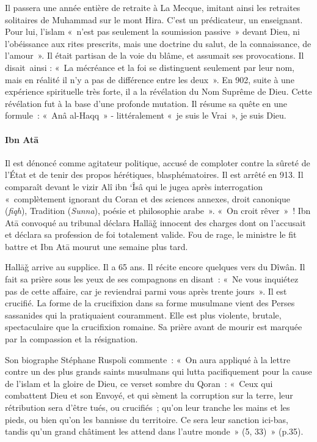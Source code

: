 Il passera une année entière de retraite à La Mecque, imitant ainsi les
retraites solitaires de Muhammad sur le mont Hira. C'est un prédicateur,
un enseignant. Pour lui, l'islam «~n'est pas seulement la soumission
passive~» devant Dieu, ni l'obéissance aux rites prescrits, mais une
doctrine du salut, de la connaissance, de l'amour~». Il était partisan
de la voie du blâme, et assumait ses provocations. Il disait~ainsi :
«~La mécréance et la foi se distinguent seulement par leur nom, mais en
réalité il n'y a pas de différence entre les deux~». En 902, suite à une
expérience spirituelle très forte, il a la révélation du Nom Suprême de
Dieu. Cette révélation fut à la base d'une profonde mutation. Il résume
sa quête en une formule~: «~Anâ al-Haqq~» - littéralement «~je suis le
Vrai~», je suis Dieu.

 
\paragraph{Ibn Atā}\label{ibn-atux101}

Il est dénoncé comme agitateur politique, accusé de comploter contre la
sûreté de l'État et de tenir des propos hérétiques, blasphématoires. Il
est arrêté en 913. Il comparaît devant le vizir Alî ibn `Îsâ qui le
jugea après interrogation «~complètement ignorant du Coran et des
sciences annexes, droit canonique (\emph{fiqh}), Tradition
(\emph{Sunna}), poésie et philosophie arabe~». «~On croit rêver~»~! Ibn Atā convoqué au
tribunal déclara Hallāǧ innocent des charges dont on l'accusait et
déclara sa profession de foi totalement valide. Fou de rage, le ministre
le fit battre et Ibn Atā mourut une semaine plus tard.

Hallāǧ arrive au supplice. Il a 65 ans. Il récite encore quelques vers
du Dîwân. Il fait sa prière sous les yeux de ses compagnons en disant~:
«~Ne vous inquiétez pas de cette affaire, car je reviendrai parmi vous
après trente jours~». Il est crucifié. La forme de la crucifixion dans
sa forme musulmane vient des Perses sassanides qui la pratiquaient
couramment. Elle est plus violente, brutale, spectaculaire que la
crucifixion romaine. Sa prière avant de mourir est marquée par la
compassion et la résignation.

Son biographe Stéphane Ruspoli commente~: «~On aura appliqué à la lettre
contre un des plus grands saints musulmans qui lutta pacifiquement pour
la cause de l'islam et la gloire de Dieu, ce verset sombre du Qoran~:
«~Ceux qui combattent Dieu et son Envoyé, et qui sèment la corruption
sur la terre, leur rétribution sera d'être tués, ou crucifiés~; qu'on
leur tranche les mains et les pieds, ou bien qu'on les bannisse du
territoire. Ce sera leur sanction ici-bas, tandis qu'un grand châtiment
les attend dans l'autre monde~» (5, 33)~» (p.35).

